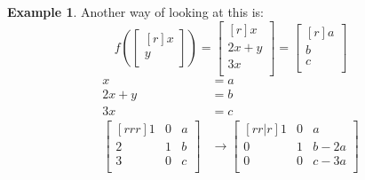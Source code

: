 \documentclass{report}
\theoremstyle{plain}
\theoremstyle{definition}
\newtheorem*{ex}{Example}
\theoremstyle{plain}
\begin{document}
\begin{ex}
Another way of looking at this is:
\[ f(\begin{bmatrix}[r]x\\y\\\end{bmatrix}) = \begin{bmatrix}[r]x\\2x+y\\3x\\\end{bmatrix} = \begin{bmatrix}[r]a\\b\\c\\\end{bmatrix} \]
\begin{align*}
x&=a\\ 2x+y&=b\\ 3x&=c\\
\begin{bmatrix}[rrr]1&0&a\\2&1&b\\3&0&c\\\end{bmatrix} &\rightarrow \begin{bmatrix}[rr|r]1&0&a\\0&1&b-2a\\0&0&c-3a\\\end{bmatrix}
\end{align*}
\end{ex}
\end{document}
